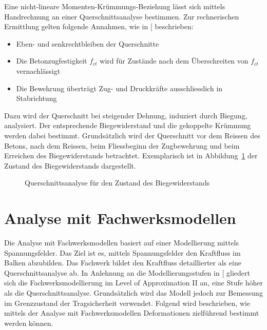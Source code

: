 \documentclass[
  12pt,
  letterpaper,
  egregdoesnotlikesansseriftitles]{scrreprt}
\providecommand{\tightlist}{%
  \setlength{\itemsep}{0pt}\setlength{\parskip}{0pt}}\usepackage{longtable,booktabs,array}
\begin{document}
Eine nicht-lineare Momenten-Krümmungs-Beziehung lässt sich mittels
Handrechnung an einer Querschnittsanalyse bestimmen. Zur rechnerischen
Ermittlung gelten folgende Annahmen, wie in
{[}\citeproc{ref-Spathelf2022}{4}{]} beschrieben:

\begin{itemize}
\tightlist
\item
  Eben- und senkrechtbleiben der Querschnitte
\item
  Die Betonzugfestigkeit \(f_{ct}\) wird für Zustände nach dem
  Überschreiten von \(f_{ct}\) vernachlässigt
\item
  Die Bewehrung überträgt Zug- und Druckkräfte ausschliesslich in
  Stabrichtung
\end{itemize}

Dazu wird der Querschnitt bei steigender Dehnung, induziert durch
Biegung, analysiert. Der entsprechende Biegewiderstand und die
gekoppelte Krümmung werden dabei bestimmt. Grundsätzlich wird der
Querschnitt vor dem Reissen des Betons, nach dem Reissen, beim
Fliessbeginn der Zugbewehrung und beim Erreichen des Biegewiderstands
betrachtet. Exemplarisch ist in Abbildung~\ref{fig-exemplar_qs_analyse}
der Zustand des Biegewiderstands dargestellt.

\begin{figure}[H]


\caption{\label{fig-exemplar_qs_analyse}Querschnittsanalyse für den
Zustand des Biegewiderstands}

\end{figure}%

\section{Analyse mit Fachwerksmodellen}\label{sec-fachwerk}

Die Analyse mit Fachwerksmodellen basiert auf einer Modellierung mittels
Spannungsfelder. Das Ziel ist es, mittels Spannungsfelder den Kraftfluss
im Balken abzubilden. Das Fachwerk bildet den Kraftfluss detaillierter
als eine Querschnittsanalyse ab. In Anlehnung an die Modellierungsstufen
in {[}\citeproc{ref-Thoma2020}{7}{]} gliedert sich die
Fachwerksmodellierung im Level of Approximation II an, eine Stufe höher
als die Querschnittsanalyse. Grundsätzlich wird das Modell jedoch zur
Bemessung im Grenzzustand der Tragsicherheit verwendet. Folgend wird
beschrieben, wie mittels der Analyse mit Fachwerksmodellen Deformationen
zielführend bestimmt werden können.
\end{document}
